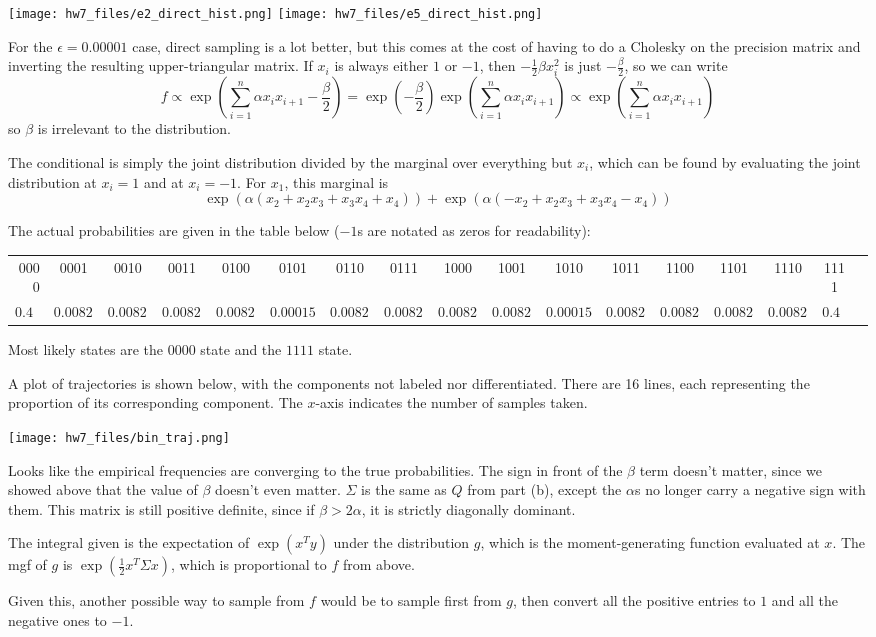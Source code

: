 \documentclass{article}
\newcommand{\ep}{\epsilon}
\begin{document}
\texttt{[image: hw7\_files/e2\_direct\_hist.png]}
\texttt{[image: hw7\_files/e5\_direct\_hist.png]}

For the $\ep=0.00001$ case, direct sampling is a lot better, but this comes at the cost of having to do a Cholesky on the precision matrix and inverting the resulting upper-triangular matrix.
If $x_i$ is always either $1$ or $-1$, then $-\frac{1}{2}\beta x_i^2$ is just $-\frac{\beta}{2}$, so we can write 
\[f\propto\exp\left(\sum_{i=1}^n\alpha x_ix_{i+1}-\frac{\beta}{2}\right)=\exp\left(-\frac{\beta}{2}\right)\exp\left(\sum_{i=1}^n\alpha x_ix_{i+1}\right)\propto\exp\left(\sum_{i=1}^n\alpha x_ix_{i+1}\right)\]
so $\beta$ is irrelevant to the distribution.

The conditional is simply the joint distribution divided by the marginal over everything but $x_i$, which can be found by evaluating the joint distribution at $x_i=1$ and at $x_i=-1$. For $x_1$, this marginal is
\[\exp\left(\alpha(x_2+x_2x_3+x_3x_4+x_4)\right)+\exp\left(\alpha(-x_2+x_2x_3+x_3x_4-x_4)\right)\]

The actual probabilities are given in the table below ($-1$s are notated as zeros for readability):

{\tiny
    \noindent
\begin{tabular}{r*{16}{c}}
    0000&0001&0010&0011&0100&0101&0110&0111&1000&1001&1010&1011&1100&1101&1110&1111\\
    $0.45$&$0.00825$&$0.00825$&$0.00825$&$0.00825$&$0.000151$&$0.00825$&$0.00825$&$0.00825$&$0.00825$&$0.000151$&$0.00825$&$0.00825$&$0.00825$&$0.00825$&$0.45$\\
\end{tabular}
}

Most likely states are the $0000$ state and the $1111$ state.

A plot of trajectories is shown below, with the components not labeled nor differentiated. There are 16 lines, each representing the proportion of its corresponding component. The $x$-axis indicates the number of samples taken.

\texttt{[image: hw7\_files/bin\_traj.png]}

Looks like the empirical frequencies are converging to the true probabilities.
The sign in front of the $\beta$ term doesn't matter, since we showed above that the value of $\beta$ doesn't even matter. $\Sigma$ is the same as $Q$ from part (b), except the $\alpha$s no longer carry a negative sign with them. This matrix is still positive definite, since if $\beta>2\alpha$, it is strictly diagonally dominant.

The integral given is the expectation of $\exp(x^Ty)$ under the distribution $g$, which is the moment-generating function evaluated at $x$. The mgf of $g$ is $\exp\left(\frac{1}{2}x^T\Sigma x\right)$, which is proportional to $f$ from above.

Given this, another possible way to sample from $f$ would be to sample first from $g$, then convert all the positive entries to $1$ and all the negative ones to $-1$.
\end{document}
